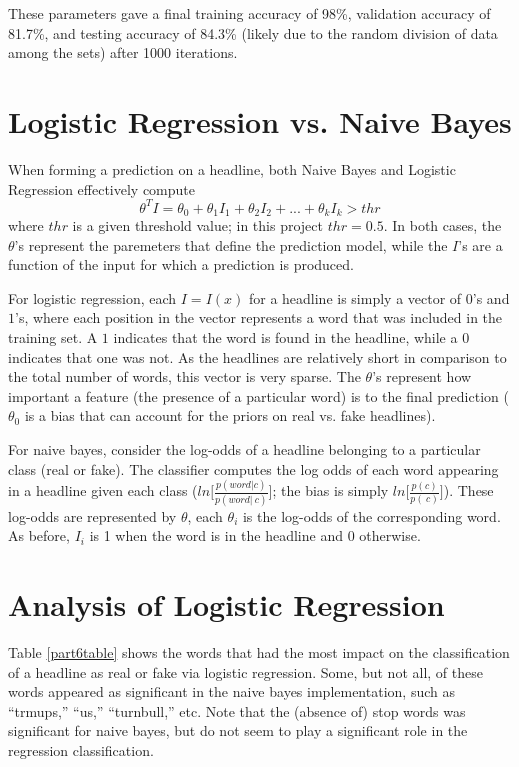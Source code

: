 \documentclass{article}
\begin{document}
   These parameters gave a final training accuracy of 98\%, validation accuracy of 81.7\%, and testing
   accuracy of 84.3\% (likely due to the random division of data among the sets) after 1000 iterations.



   \section{Logistic Regression vs. Naive Bayes}
   When forming a prediction on a headline, both Naive Bayes and Logistic Regression effectively compute
   \begin{equation*}
      \theta^T I = \theta_0 + \theta_1 I_1 + \theta_2 I_2 + ... + \theta_k I_k > thr
   \end{equation*}
   where $thr$ is a given threshold value; in this project $thr = 0.5$. In both cases, the $\theta$'s represent
   the paremeters that define the prediction model, while the $I$'s are a function of the input for which a
   prediction is produced.

   For logistic regression, each $I = I(x)$ for a headline is simply a vector of $0$'s and $1$'s, where each
   position in the vector represents a word that was included in the training set. A $1$ indicates that the
   word is found in the headline, while a $0$ indicates that one was not. As the headlines are relatively short
   in comparison to the total number of words, this vector is very sparse. The $\theta$'s represent how important
   a feature (the presence of a particular word) is to the final prediction ($\theta_0$ is a bias that can
   account for the priors on real vs. fake headlines).

   For naive bayes, consider the log-odds of a headline belonging to a particular class (real or fake). The
   classifier computes the log odds of each word appearing in a headline given each class
   ($ln \big[ \frac{p(word | c)}{p(word | ~c)} \big]$; the bias is simply $ln \big[ \frac{p(c)}{p(~c)}\big]$).
   These log-odds are represented by $\theta$, each $\theta_i$ is the log-odds of the corresponding word.
   As before, $I_i$ is 1 when the word is in the headline and 0 otherwise.



   \section{Analysis of Logistic Regression}
   Table \ref{part6table} shows the words that had the most impact on the classification of a headline
   as real or fake via logistic regression. Some, but not all, of these words appeared as significant
   in the naive bayes implementation, such as ``trmups,'' ``us,'' ``turnbull,'' etc. Note that the (absence
   of) stop words was significant for naive bayes, but do not seem to play a significant role in
   the regression classification.
\end{document}
